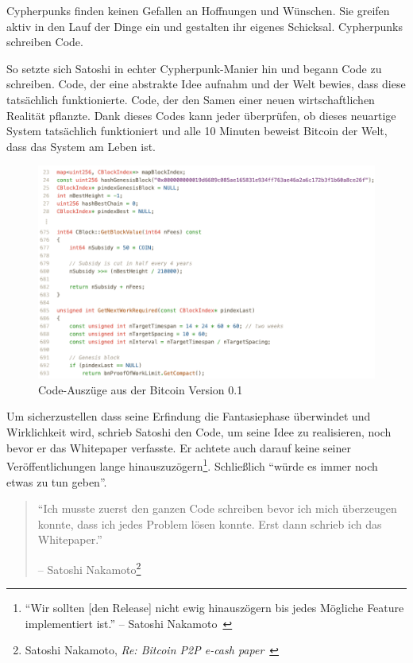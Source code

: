 Cypherpunks finden keinen Gefallen an Hoffnungen und Wünschen. Sie greifen aktiv
in den Lauf der Dinge ein und gestalten ihr eigenes Schicksal. Cypherpunks
schreiben Code.

So setzte sich Satoshi in echter Cypherpunk-Manier hin und begann Code zu
schreiben. Code, der eine abstrakte Idee aufnahm und der Welt bewies, dass diese
tatsächlich funktionierte. Code, der den Samen einer neuen wirtschaftlichen
Realität pflanzte. Dank dieses Codes kann jeder überprüfen, ob dieses neuartige
System tatsächlich funktioniert und alle 10 Minuten beweist Bitcoin der Welt,
dass das System am Leben ist.

\begin{figure}
  \includegraphics{assets/images/bitcoin-code-white.png}
  \caption{Code-Auszüge aus der Bitcoin Version 0.1}
  \label{fig:bitcoin-code-white}
\end{figure}

Um sicherzustellen dass seine Erfindung die Fantasiephase überwindet und
Wirklichkeit wird, schrieb Satoshi den Code, um seine Idee zu realisieren, noch
bevor er das Whitepaper verfasste. Er achtete auch darauf keine seiner
Veröffentlichungen lange hinauszuzögern\footnote{\enquote{Wir sollten [den
Release] nicht ewig hinauszögern bis jedes Mögliche Feature implementiert ist.}
-- Satoshi Nakamoto~\cite{satoshi-delay}}. Schließlich \enquote{würde es immer
noch etwas zu tun geben}.

\begin{quotation}\begin{samepage}
\enquote{Ich musste zuerst den ganzen Code schreiben bevor ich mich überzeugen konnte, dass ich jedes Problem lösen konnte.
Erst dann schrieb ich das Whitepaper.}
\begin{flushright} -- Satoshi Nakamoto\footnote{Satoshi Nakamoto, \textit{Re: Bitcoin P2P e-cash paper}~\cite{satoshi-mail-code-first}}
\end{flushright}\end{samepage}\end{quotation}

